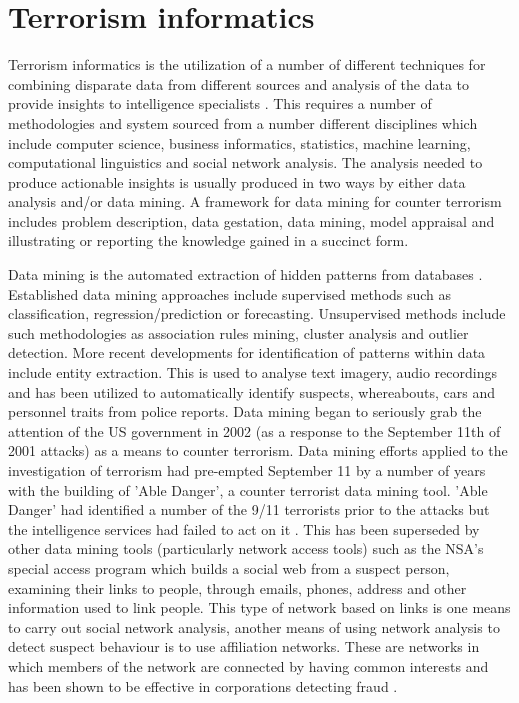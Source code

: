 \section{Terrorism informatics}
Terrorism informatics is the utilization of a number of different techniques for combining disparate data from different sources and analysis of the data to provide insights to intelligence specialists \citep{chau2015intelligence}. This requires a number of methodologies and system sourced from a number different disciplines which include computer science, business informatics, statistics, machine learning, computational linguistics and social network analysis. The analysis needed to produce actionable insights is usually produced in two ways by either data analysis and/or data mining. A framework for data mining for counter terrorism  includes problem description, data gestation, data mining, model appraisal and illustrating or reporting the knowledge gained in a succinct form.

Data mining is the automated extraction of hidden patterns from databases \citep{shmueli2016data}. Established data mining approaches include supervised methods such as  classification, regression/prediction or forecasting. Unsupervised methods include such methodologies as association rules mining, cluster analysis and outlier detection. More recent developments for identification of patterns within data include entity extraction. This is used to analyse text imagery, audio recordings and has been utilized to automatically identify suspects, whereabouts, cars and personnel traits from police reports. Data mining began to seriously grab the attention of the US government in 2002 (as a response to the September 11th of 2001 attacks) as a means to counter terrorism. Data mining efforts applied to the investigation of terrorism had pre-empted September 11 by a number of years with the building of 'Able Danger', a counter terrorist data mining tool. 'Able Danger' \citep{keefe2006can} had identified a number of the 9/11 terrorists prior to the attacks but the intelligence services had failed to act on it \citep{lance2006triple}. This has been superseded by other data mining tools (particularly network access tools) such as the NSA's special access program which builds a social web from a suspect person, examining their links to people, through emails, phones, address and other information used to link people. This type of network based on links is one means to carry out social network analysis, another means of using network analysis to detect suspect behaviour is to use affiliation networks. These are networks in which members of the network are connected by having common interests and has been shown to be effective in corporations detecting fraud \citep{ben2009organised}.

